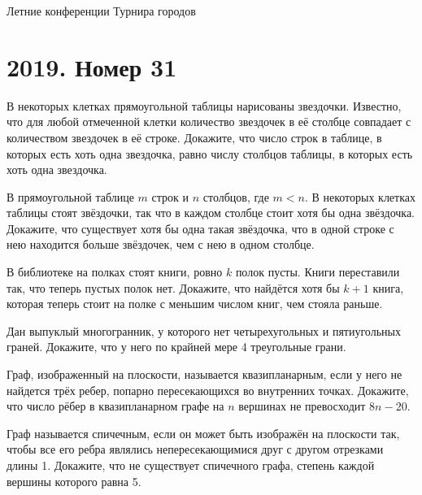 \documentclass[11pt, a4paper]{common/document_template}
\begin{document}
\begin{titlepage}
  \begin{center}
	\Huge{Летние конференции Турнира городов}
  \end{center}
\end{titlepage}
 
\chapter{2019. Номер 31}

\begin{exercise}
В некоторых клетках прямоугольной таблицы нарисованы звездочки. Известно, что для любой отмеченной клетки количество звездочек в её столбце совпадает с количеством звездочек в её строке. Докажите, что число строк в таблице, в которых есть хоть одна звездочка, равно числу столбцов таблицы, в которых есть хоть одна звездочка.
\end{exercise}

\begin{exercise}
В прямоугольной таблице $m$ строк и $n$ столбцов, где $m < n$. В некоторых клетках таблицы стоят звёздочки, так что в каждом столбце стоит хотя бы одна звёздочка. Докажите, что существует хотя бы одна такая звёздочка, что в одной строке с нею находится больше звёздочек, чем с нею в одном столбце.
\end{exercise}

\begin{exercise}
В библиотеке на полках стоят книги, ровно $k$ полок пусты. Книги переставили так, что теперь пустых полок нет. Докажите, что найдётся хотя бы $k + 1$ книга, которая теперь стоит на полке с меньшим числом книг, чем стояла раньше.
\end{exercise}

\begin{exercise}
Дан выпуклый многогранник, у которого нет четырехугольных и пятиугольных граней. Докажите, что у него по крайней мере 4 треугольные грани.
\end{exercise}

\begin{exercise}
Граф, изображенный на плоскости, называется квазипланарным, если у него не найдется трёх ребер, попарно пересекающихся во внутренних точках. Докажите, что число рёбер в квазипланарном графе на $n$ вершинах не превосходит $8n - 20$.
\end{exercise}
 
\begin{exercise}
Граф называется спичечным, если он может быть изображён на плоскости так, чтобы все его ребра являлись непересекающимися друг с другом отрезками длины 1. Докажите, что не существует спичечного графа, степень каждой вершины которого равна 5.
\end{exercise} 
 
\end{document}
